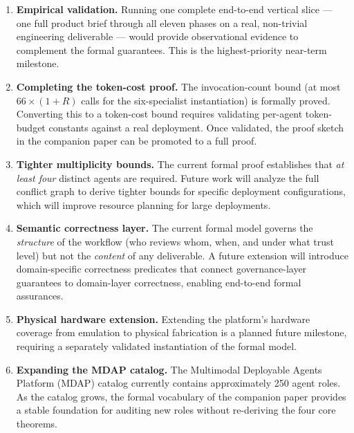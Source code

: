 \documentclass[12pt]{article}
\begin{document}
\begin{enumerate}

    \item \textbf{Empirical validation.}
          Running one complete end-to-end vertical slice --- one full
          product brief through all eleven phases on a real,
          non-trivial engineering deliverable --- would provide
          observational evidence to complement the formal guarantees.
          This is the highest-priority near-term milestone.

    \item \textbf{Completing the token-cost proof.}
          The invocation-count bound (at most $66 \times (1 + R)$
          calls for the six-specialist instantiation) is formally
          proved.
          Converting this to a token-cost bound requires validating
          per-agent token-budget constants against a real deployment.
          Once validated, the proof sketch in the companion paper
          can be promoted to a full proof.

    \item \textbf{Tighter multiplicity bounds.}
          The current formal proof establishes that \emph{at least
          four} distinct agents are required.
          Future work will analyze the full conflict graph to derive
          tighter bounds for specific deployment configurations,
          which will improve resource planning for large deployments.

    \item \textbf{Semantic correctness layer.}
          The current formal model governs the \emph{structure} of the
          workflow (who reviews whom, when, and under what trust level)
          but not the \emph{content} of any deliverable.
          A future extension will introduce domain-specific correctness
          predicates that connect governance-layer guarantees to
          domain-layer correctness, enabling end-to-end formal
          assurances.

    \item \textbf{Physical hardware extension.}
          Extending the platform's hardware coverage from emulation
          to physical fabrication is a planned future milestone,
          requiring a separately validated instantiation of the
          formal model.

    \item \textbf{Expanding the MDAP catalog.}
          The Multimodal Deployable Agents Platform (MDAP) catalog
          currently contains approximately 250 agent roles.
          As the catalog grows, the formal vocabulary of the companion
          paper provides a stable foundation for auditing new roles
          without re-deriving the four core theorems.

\end{enumerate}
\end{document}
